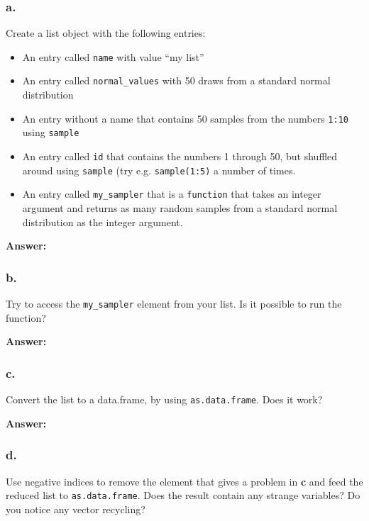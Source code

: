 \documentclass[]{article}
\providecommand{\tightlist}{%
  \setlength{\itemsep}{0pt}\setlength{\parskip}{0pt}}
\begin{document}
\hypertarget{a.}{%
\subsubsection{a.}\label{a.}}

Create a list object with the following entries:

\begin{itemize}
\tightlist
\item
  An entry called \texttt{name} with value ``my list''
\item
  An entry called \texttt{normal\_values} with 50 draws from a standard
  normal distribution
\item
  An entry without a name that contains 50 samples from the numbers
  \texttt{1:10} using \texttt{sample}
\item
  An entry called \texttt{id} that contains the numbers 1 through 50,
  but shuffled around using \texttt{sample} (try e.g.
  \texttt{sample(1:5)} a number of times.
\item
  An entry called \texttt{my\_sampler} that is a \texttt{function} that
  takes an integer argument and returns as many random samples from a
  standard normal distribution as the integer argument.
\end{itemize}

\textbf{Answer:}

\hypertarget{b.}{%
\subsubsection{b.}\label{b.}}

Try to access the \texttt{my\_sampler} element from your list. Is it
possible to run the function?

\textbf{Answer:}

\hypertarget{c.}{%
\subsubsection{c.}\label{c.}}

Convert the list to a data.frame, by using \texttt{as.data.frame}. Does
it work?

\textbf{Answer:}

\hypertarget{d.}{%
\subsubsection{d.}\label{d.}}

Use negative indices to remove the element that gives a problem in
\textbf{c} and feed the reduced list to \texttt{as.data.frame}. Does the
result contain any strange variables? Do you notice any vector
recycling?
\end{document}
